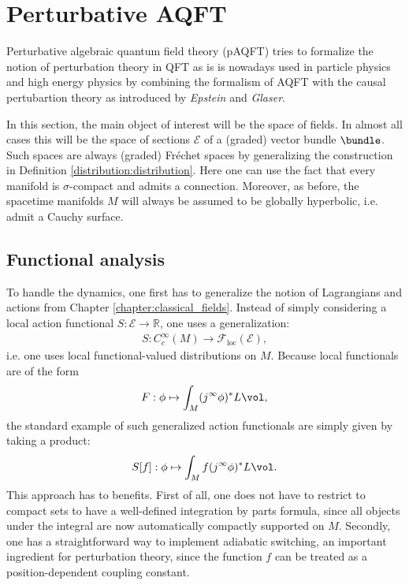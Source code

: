 \section{Perturbative AQFT}

    Perturbative algebraic quantum field theory (pAQFT) tries to formalize the notion of perturbation theory in QFT as is is nowadays used in particle physics and high energy physics by combining the formalism of AQFT with the causal pertubartion theory as introduced by \textit{Epstein} and \textit{Glaser}.

    In this section, the main object of interest will be the space of fields. In almost all cases this will be the space of sections $\mathcal{E}$ of a (graded) vector bundle $\bundle$. Such spaces are always (graded) Fr\'echet spaces by generalizing the construction in Definition \ref{distribution:distribution}. Here one can use the fact that every manifold is $\sigma$-compact and admits a connection. Moreover, as before, the spacetime manifolds $M$ will always be assumed to be globally hyperbolic, i.e. admit a Cauchy surface.

\subsection{Functional analysis}

    To handle the dynamics, one first has to generalize the notion of Lagrangians and actions from Chapter \ref{chapter:classical_fields}. Instead of simply considering a local action functional $S:\mathcal{E}\rightarrow\mathbb{R}$, one uses a generalization:
    \begin{gather}
        S:C^\infty_c(M)\rightarrow\mathcal{F}_\mathrm{loc}(\mathcal{E}),
    \end{gather}
    i.e. one uses local functional-valued distributions on $M$. Because local functionals are of the form
    \begin{gather}
        F:\phi\mapsto\int_M (j^\infty\phi)^*L\vol,
    \end{gather}
    the standard example of such generalized action functionals are simply given by taking a product:
    \begin{gather}
        S[f]:\phi\mapsto\int_Mf(j^\infty\phi)^*L\vol.
    \end{gather}
    This approach has to benefits. First of all, one does not have to restrict to compact sets to have a well-defined integration by parts formula, since all objects under the integral are now automatically compactly supported on $M$. Secondly, one has a straightforward way to implement adiabatic switching, an important ingredient for perturbation theory, since the function $f$ can be treated as a position-dependent coupling constant.

